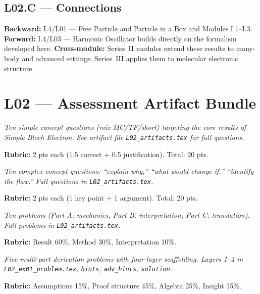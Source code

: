 \subsection*{L02.C — Connections}
\label{sec:L02.C}
\textbf{Backward:} I.4/L01 — Free Particle and Particle in a Box and Modules I.1–I.3.
\textbf{Forward:} I.4/L03 — Harmonic Oscillator builds directly on the formalism developed here.
\textbf{Cross-module:} Series~II modules extend these results to many-body and
advanced settings; Series~III applies them to molecular electronic structure.

\newpage
\section*{L02 — Assessment Artifact Bundle}

\begin{tcolorbox}[ugconceptbox, title={SCQU · L02 · Tiers 1–3 · 15–20 min}]
\textit{Ten simple concept questions (mix MC/TF/short) targeting the core results
of Simple Bloch Electron. See artifact file \texttt{L02_artifacts.tex} for full questions.}

\textbf{Rubric:} 2 pts each (1.5 correct + 0.5 justification). Total: 20 pts.
\end{tcolorbox}

\begin{tcolorbox}[ugconceptbox, title={CCQU · L02 · Tiers 2–3 · 25–35 min}]
\textit{Ten complex concept questions: ``explain why,'' ``what would change if,''
``identify the flaw.'' Full questions in \texttt{L02_artifacts.tex}.}

\textbf{Rubric:} 2 pts each (1 key point + 1 argument). Total: 20 pts.
\end{tcolorbox}

\begin{tcolorbox}[ugprobbox, title={SPSU · L02 · Tiers 1–3 · 60–90 min}]
\textit{Ten problems (Part A: mechanics, Part B: interpretation, Part C: translation).
Full problems in \texttt{L02_artifacts.tex}.}

\textbf{Rubric:} Result 60\%, Method 30\%, Interpretation 10\%.
\end{tcolorbox}

\begin{tcolorbox}[ugprobbox, title={CPSU · L02 · Tier 3 · 3–6 hrs (4-layer)}]
\textit{Five multi-part derivation problems with four-layer scaffolding.
Layers 1–4 in \texttt{L02_ex01\_problem.tex}, \texttt{hints}, \texttt{adv\_hints}, \texttt{solution}.}

\textbf{Rubric:} Assumptions 15\%, Proof structure 45\%, Algebra 25\%, Insight 15\%.
\end{tcolorbox}

